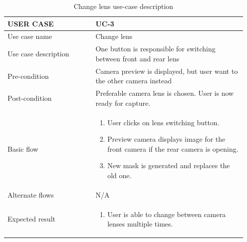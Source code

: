 \begin{center}
\begin{table} [H]
\caption{Change lens use-case description} 
\begin{tabular}{p{0.35\linewidth} | p{0.6\linewidth}}
\hline
USER CASE            & UC-3 \\ \hline
Use case name        &  Change lens  \\ \hline
Use case description &   One button is responsible for switching between front and rear lens  \\ \hline
Pre-condition         &   Camera preview is displayed, but user want to the other camera instead   \\ \hline
Post-condition        &   Preferable camera lens is chosen. User is now ready for capture.   \\ \hline
Basic flow           &  \begin{enumerate}
  \item User clicks on lens switching button.
  \item	Preview camera displays image for the front camera if the rear camera is opening. 
  \item New mask is generated and replaces the old one.
\end{enumerate}    \\ \hline
Alternate flows      &   N/A   \\ \hline
Expected result      & \begin{enumerate}
    \item User is able to change between camera lenses multiple times.
\end{enumerate}     \\ \hline
\end{tabular}
\end{table}
\end{center}


